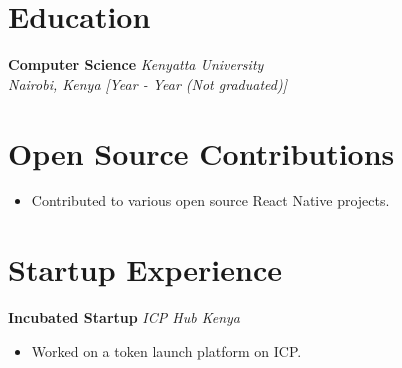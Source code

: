 \documentclass[a4paper,10pt]{article}
\begin{document}
\section*{Education}

\textbf{Computer Science} \hfill \textit{Kenyatta University} \\
\textit{Nairobi, Kenya} \hfill \textit{[Year - Year (Not graduated)]}

\section*{Open Source Contributions}
\begin{itemize}
    \item Contributed to various open source React Native projects.
\end{itemize}

\section*{Startup Experience}
\textbf{Incubated Startup} \hfill \textit{ICP Hub Kenya} \\
\begin{itemize}
    \item Worked on a token launch platform on ICP.
\end{itemize}
\end{document}
